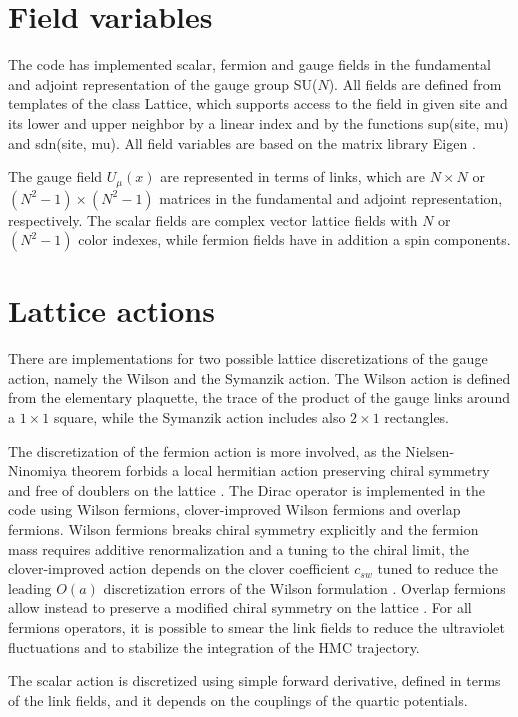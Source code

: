 \documentclass[11pt,a4paper]{article}
\begin{document}
\section{Field variables}

The code has implemented scalar, fermion and gauge fields in the fundamental and adjoint representation of the gauge group SU($N$). All fields are defined from templates of the class Lattice, which supports access to the field in given site and its lower and upper neighbor by a linear index and by the functions sup(site, mu) and sdn(site, mu). All field variables are based on the matrix library Eigen \cite{EIGEN}.

The gauge field $U_\mu(x)$ are represented in terms of links, which are $N\times N$ or $(N^2-1)\times (N^2-1)$ matrices in the fundamental and adjoint representation, respectively. The scalar fields are complex vector lattice fields with $N$ or $(N^2-1)$ color indexes, while fermion fields have in addition a spin components.

\section{Lattice actions}

There are implementations for two possible lattice discretizations of the gauge action, namely the Wilson and the Symanzik action. The Wilson action is defined from the elementary plaquette, the trace of the product of the gauge links around a $1\times1$ square, while the Symanzik action includes also $2\times1$ rectangles. 

The discretization of the fermion action is more involved, as the Nielsen-Ninomiya theorem forbids a local hermitian action preserving chiral symmetry and free of doublers on the lattice \cite{NIE81}. The Dirac operator is implemented in the code using Wilson fermions, clover-improved Wilson fermions and overlap fermions. Wilson fermions breaks chiral symmetry explicitly and the fermion mass requires additive renormalization and a tuning to the chiral limit, the clover-improved action depends on the clover coefficient $c_{sw}$ tuned to reduce the leading $O(a)$ discretization errors of the Wilson formulation \cite{JAN97}. Overlap fermions allow instead to preserve a modified chiral symmetry on the lattice \cite{GIS82}. For all fermions operators, it is possible to smear the link fields to reduce the ultraviolet fluctuations and to stabilize the integration of the HMC trajectory.

The scalar action is discretized using simple forward derivative, defined in terms of the link fields, and it depends on the couplings of the quartic potentials.
\end{document}
